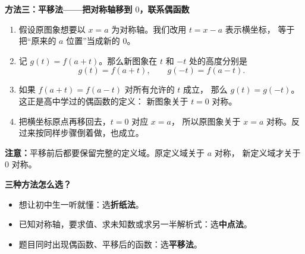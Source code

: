 \clearpage
\begin{proofbox}
\textbf{\textcolor{CProof}{方法三：平移法——把对称轴移到 $0$，联系偶函数}}


  \begin{enumerate}[leftmargin=*,itemsep=0.5em]
    \item 假设原图象想要以 $x=a$ 为对称轴。我们改用 $t=x-a$ 表示横坐标，
      等于把“原来的 $a$ 位置”当成新的 $0$。
    \item 记 $g(t)=f(a+t)$。那么新图象在 $t$ 和 $-t$ 处的高度分别是
      \[
        g(t)=f(a+t),\qquad g(-t)=f(a-t).
      \]
    \item 如果 $f(a+t)=f(a-t)$ 对所有允许的 $t$ 成立，
      那么 $g(t)=g(-t)$。这正是高中学过的偶函数的定义：
      新图象关于 $t=0$ 对称。
    \item 把横坐标原点再移回去，$t=0$ 对应 $x=a$，
      所以原图象关于 $x=a$ 对称。反过来按同样步骤倒着做，也成立。
  \end{enumerate}
  \textbf{注意：}平移前后都要保留完整的定义域。原定义域关于 $a$ 对称，
  新定义域才关于 $0$ 对称。

  \medskip
  \textbf{\textcolor{CProof}{三种方法怎么选？}}
  \begin{itemize}[leftmargin=*,itemsep=0.35em]
    \item 想让初中生一听就懂：选\textbf{折纸法}。
    \item 已知对称轴，要求值、求未知数或求另一半解析式：选\textbf{中点法}。
    \item 题目同时出现偶函数、平移后的函数：选\textbf{平移法}。
  \end{itemize}
\end{proofbox}

